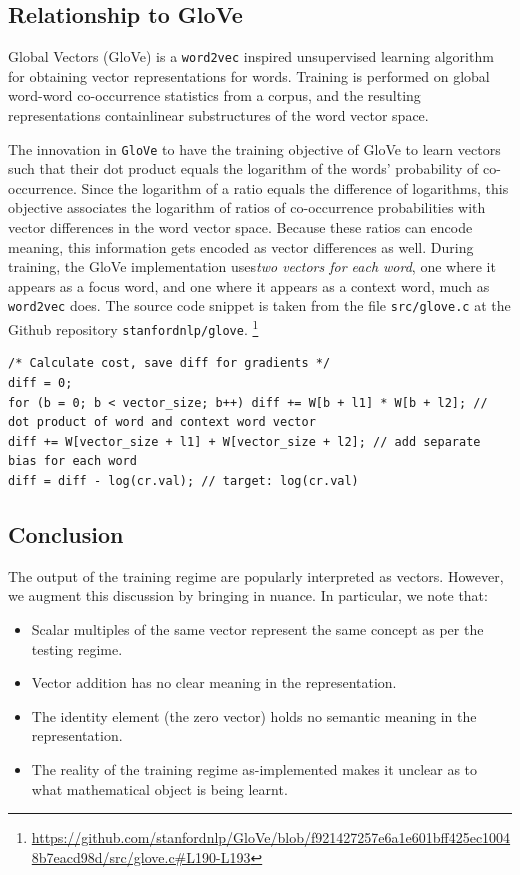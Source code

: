\documentclass[11pt]{book}
\begin{document}

\subsection{Relationship to GloVe}

Global Vectors (GloVe) \cite{pennington2014glove} is a \texttt{word2vec}
inspired  unsupervised learning algorithm for obtaining vector representations
for words. Training is performed on global word-word co-occurrence statistics
from a corpus, and the resulting representations containlinear substructures of
the word vector space. 


The innovation in \texttt{GloVe} to have the
training objective of GloVe to learn 
vectors such that their dot product equals the logarithm of the words'
probability of co-occurrence. Since the logarithm of a ratio
equals the difference of logarithms, this objective associates the logarithm
of ratios of co-occurrence probabilities with vector differences in the word
vector space. Because these ratios can encode meaning, this
information gets encoded as vector differences as well. During training,
the GloVe implementation uses\emph{two vectors for each word}, one where it
appears as a focus word, and one where it appears as a context word, much as
\texttt{word2vec} does. The source code snippet is taken from the file \texttt{src/glove.c} at 
the Github repository \texttt{stanfordnlp/glove}.
\footnote{\url{https://github.com/stanfordnlp/GloVe/blob/f921427257e6a1e601bff425ec10048b7eacd98d/src/glove.c\#L190-L193}}

\begin{verbatim}
/* Calculate cost, save diff for gradients */
diff = 0;
for (b = 0; b < vector_size; b++) diff += W[b + l1] * W[b + l2]; // dot product of word and context word vector
diff += W[vector_size + l1] + W[vector_size + l2]; // add separate bias for each word
diff = diff - log(cr.val); // target: log(cr.val)
\end{verbatim}

\subsection{Conclusion}

The output of the training regime are popularly interpreted as vectors.
However, we augment this discussion by bringing in nuance. In particular, we
note that:
\begin{itemize}
\item Scalar multiples of the same vector represent the same concept as per the testing regime.
\item Vector addition has no clear meaning in the representation.
\item The identity element (the zero vector) holds no semantic meaning in the representation.
\item The reality of the training regime as-implemented makes it unclear as to
      what mathematical object is being learnt.
\end{itemize}
\end{document}
